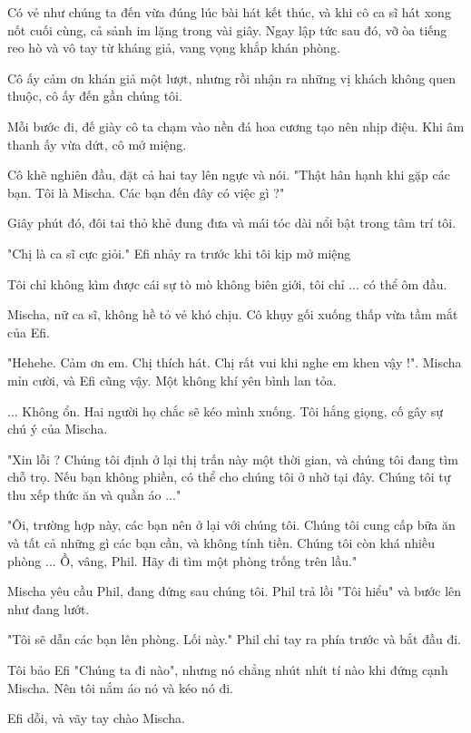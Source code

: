 Có vẻ như chúng ta đến vừa đúng lúc bài hát kết thúc, và khi cô ca sĩ hát xong nốt cuối cùng, cả sảnh im lặng trong vài giây. Ngay lập tức sau đó, vỡ òa tiếng reo hò và vô tay từ kháng giả, vang vọng khắp khán phòng.

Cô ấy cảm ơn khán giả một lượt, nhưng rồi nhận ra những vị khách không quen thuộc, cô ấy đến gần chúng tôi. 

Mỗi bước đi, đế giày cô ta chạm vào nền đá hoa cương tạo nên nhịp điệu. Khi âm thanh ấy vừa dứt, cô mở miệng.

Cô khẽ nghiên đầu, đặt cả hai tay lên ngực và nói. "Thật hân hạnh khi gặp các bạn. Tôi là Mischa. Các bạn đến đây có việc gì ?"

Giây phút đó, đôi tai thỏ khẻ đung đưa và mái tóc dài nổi bật trong tâm trí tôi.

"Chị là ca sĩ cực giỏi." Efi nhảy ra trước khi tôi kịp mở miệng

Tôi chỉ không kìm được cái sự tò mò không biên giới, tôi chỉ ... có thể ôm đầu.

Mischa, nữ ca sĩ, không hề tỏ vẻ khó chịu. Cô khụy gối xuống thấp vừa tầm mắt của Efi.

"Hehehe. Cảm ơn em. Chị thích hát. Chị rất vui khi nghe em khen vậy !". Mischa mỉn cười, và Efi cũng vậy. Một không khí yên bình lan tỏa. 

... Không ổn. Hai người họ chắc sẽ kéo mình xuống. Tôi hắng giọng, cố gây sự chú ý của Mischa.

"Xin lỗi ? Chúng tôi định ở lại thị trấn này một thời gian, và chúng tôi đang tìm chỗ trọ. Nếu bạn không phiền, có thể cho chúng tôi ở nhờ tại đây. Chúng tôi tự thu xếp thức ăn và quần áo ..."

"Ôi, trường hợp này, các bạn nên ở lại với chúng tôi. Chúng tôi cung cấp bữa ăn và tất cả những gì các bạn cần, và không tính tiền. Chúng tôi còn khá nhiều phòng ... Ồ, vâng, Phil. Hãy đi tìm một phòng trống trên lầu."

Mischa yêu cầu Phil, đang đứng sau chúng tôi. Phil trả lồi "Tôi hiểu" và bước lên như đang lướt. 

"Tôi sẽ dẫn các bạn lên phòng. Lối này." Phil chỉ tay ra phía trước và bắt đầu đi.

Tôi bảo Efi "Chúng ta đi nào", nhưng nó chẳng nhút nhít tí nào khi đứng cạnh Mischa. Nên tôi nắm áo nó và kéo nó đi.

Efi dỗi, và vãy tay chào Mischa.\\


